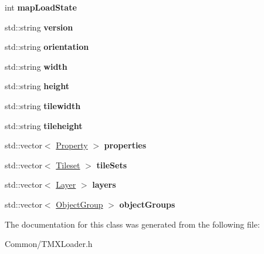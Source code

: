 \begin{DoxyCompactItemize}
\item 
\hypertarget{classbali_1_1tmx_1_1_map_a8364cd0e8bb00a06788cb4d7c1bd4631}{int {\bfseries map\-Load\-State}}\label{classbali_1_1tmx_1_1_map_a8364cd0e8bb00a06788cb4d7c1bd4631}

\item 
\hypertarget{classbali_1_1tmx_1_1_map_ad244c13feaf35724ecd91e12d1813017}{std\-::string {\bfseries version}}\label{classbali_1_1tmx_1_1_map_ad244c13feaf35724ecd91e12d1813017}

\item 
\hypertarget{classbali_1_1tmx_1_1_map_ae9c0e135406c10cd7b0136ca6ab0e6c1}{std\-::string {\bfseries orientation}}\label{classbali_1_1tmx_1_1_map_ae9c0e135406c10cd7b0136ca6ab0e6c1}

\item 
\hypertarget{classbali_1_1tmx_1_1_map_a235621309f407ffa0875c6fad5450415}{std\-::string {\bfseries width}}\label{classbali_1_1tmx_1_1_map_a235621309f407ffa0875c6fad5450415}

\item 
\hypertarget{classbali_1_1tmx_1_1_map_ac8b9c6fe7639a6815b12cadc0552f3e6}{std\-::string {\bfseries height}}\label{classbali_1_1tmx_1_1_map_ac8b9c6fe7639a6815b12cadc0552f3e6}

\item 
\hypertarget{classbali_1_1tmx_1_1_map_ac7d0aab8d41e5dce576d1c4fb9ed4c7f}{std\-::string {\bfseries tilewidth}}\label{classbali_1_1tmx_1_1_map_ac7d0aab8d41e5dce576d1c4fb9ed4c7f}

\item 
\hypertarget{classbali_1_1tmx_1_1_map_adce4c0af2af773d13d2089b76c2f9201}{std\-::string {\bfseries tileheight}}\label{classbali_1_1tmx_1_1_map_adce4c0af2af773d13d2089b76c2f9201}

\item 
\hypertarget{classbali_1_1tmx_1_1_map_a729c17b999309c5fdb42476a62ebfeef}{std\-::vector$<$ \hyperlink{classbali_1_1tmx_1_1_property}{Property} $>$ {\bfseries properties}}\label{classbali_1_1tmx_1_1_map_a729c17b999309c5fdb42476a62ebfeef}

\item 
\hypertarget{classbali_1_1tmx_1_1_map_a312b92c49857b824ca1470e769c3eecd}{std\-::vector$<$ \hyperlink{classbali_1_1tmx_1_1_tileset}{Tileset} $>$ {\bfseries tile\-Sets}}\label{classbali_1_1tmx_1_1_map_a312b92c49857b824ca1470e769c3eecd}

\item 
\hypertarget{classbali_1_1tmx_1_1_map_a94546e518ce1da27bba1be625250cf17}{std\-::vector$<$ \hyperlink{classbali_1_1tmx_1_1_layer}{Layer} $>$ {\bfseries layers}}\label{classbali_1_1tmx_1_1_map_a94546e518ce1da27bba1be625250cf17}

\item 
\hypertarget{classbali_1_1tmx_1_1_map_a947ef316605d1eba0f8596ae2e67b6bc}{std\-::vector$<$ \hyperlink{classbali_1_1tmx_1_1_object_group}{Object\-Group} $>$ {\bfseries object\-Groups}}\label{classbali_1_1tmx_1_1_map_a947ef316605d1eba0f8596ae2e67b6bc}

\end{DoxyCompactItemize}


The documentation for this class was generated from the following file\-:\begin{DoxyCompactItemize}
\item 
Common/T\-M\-X\-Loader.\-h\end{DoxyCompactItemize}
